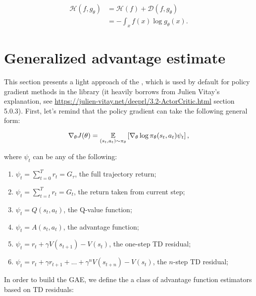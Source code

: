 \begin{equation}
\label{eq:cross_entropy}
\begin{aligned}
	\mathcal{H}(f,g_\theta) 	&= \mathcal{H}(f) + \mathcal{D}(f,g_\theta)\\
						&= - \int_{x} f(x) \log g_\theta(x).
\end{aligned}
\end{equation}

\section{Generalized advantage estimate}
\label{section:gae}

This section presents a light approach of the \gae, which is used by default for policy gradient methods in the library (it heavily borrows from Julien Vitay's explanation, see \url{https://julien-vitay.net/deeprl/3.2-ActorCritic.html} section 5.0.3). First, let's remind that the policy gradient can take the following general form:

\begin{equation}
	\nabla_\theta J(\theta) = \underset{(s_t,a_t) \sim \pi_\theta}{\mathbb{E}} \left[ \nabla_\theta \log \pi_\theta (s_t,a_t) \psi_t \right],
\end{equation}

where $\psi_t$ can be any of the following:

\begin{enumerate}
	\item $\psi_t = \sum_{t=0}^T r_t = G_\tau$, the full trajectory return;
	\item $\psi_t = \sum_{t=t}^T r_t = G_t$, the return taken from current step;
	\item $\psi_t = Q(s_t, a_t)$, the Q-value function;
	\item $\psi_t = A(s_t, a_t)$, the advantage function;
	\item $\psi_t = r_t + \gamma V(s_{t+1}) - V(s_t)$, the one-step TD residual;
	\item $\psi_t = r_t + \gamma r_{t+1} + ... + \gamma^n V(s_{t+n}) - V(s_t)$, the $n$-step TD residual;
\end{enumerate}

In order to build the GAE, we define the a class of advantage function estimators based on TD residuals:

